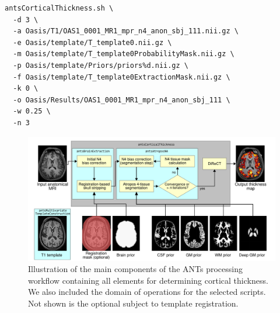 \begin{lstlisting}
antsCorticalThickness.sh \
  -d 3 \
  -a Oasis/T1/OAS1_0001_MR1_mpr_n4_anon_sbj_111.nii.gz \
  -e Oasis/template/T_template0.nii.gz \
  -m Oasis/template/T_template0ProbabilityMask.nii.gz \
  -p Oasis/template/Priors/priors%d.nii.gz \
  -f Oasis/template/T_template0ExtractionMask.nii.gz \
  -k 0 \
  -o Oasis/Results/OAS1_0001_MR1_mpr_n4_anon_sbj_111 \
  -w 0.25 \
  -n 3
\end{lstlisting}



\begin{figure}
  \centering
  \includegraphics[width=180mm]{Figures/Kapowski_pipeline2.pdf}
  \caption{Illustration of the main components of the ANTs processing 
  workflow containing all elements for determining cortical thickness. 
  We also included the domain of operations for the selected scripts.
  Not shown is the optional subject to template registration.}
  \label{fig:pipeline}
\end{figure}

